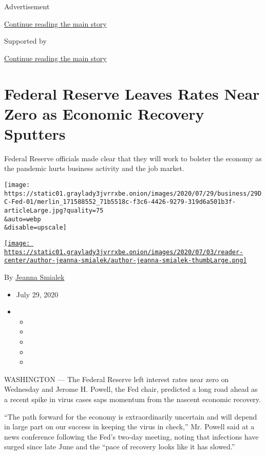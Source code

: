 Advertisement

\protect\hyperlink{after-top}{Continue reading the main story}

Supported by

\protect\hyperlink{after-sponsor}{Continue reading the main story}

\hypertarget{federal-reserve-leaves-rates-near-zero-as-economic-recovery-sputters}{%
\section{Federal Reserve Leaves Rates Near Zero as Economic Recovery
Sputters}\label{federal-reserve-leaves-rates-near-zero-as-economic-recovery-sputters}}

Federal Reserve officials made clear that they will work to bolster the
economy as the pandemic hurts business activity and the job market.

\texttt{[image: https://static01.graylady3jvrrxbe.onion/images/2020/07/29/business/29DC-Fed-01/merlin\_171588552\_71b5518c-f3c6-4426-9279-319d6a501b3f-articleLarge.jpg?quality=75\\\&auto=webp\\\&disable=upscale]}

\href{https://www.nytimes3xbfgragh.onion/by/jeanna-smialek}{\texttt{[image: https://static01.graylady3jvrrxbe.onion/images/2020/07/03/reader-center/author-jeanna-smialek/author-jeanna-smialek-thumbLarge.png]}}

By \href{https://www.nytimes3xbfgragh.onion/by/jeanna-smialek}{Jeanna
Smialek}

\begin{itemize}
\item
  July 29, 2020
\item
  \begin{itemize}
  \item
  \item
  \item
  \item
  \item
  \end{itemize}
\end{itemize}

WASHINGTON --- The Federal Reserve left interest rates near zero on
Wednesday and Jerome H. Powell, the Fed chair, predicted a long road
ahead as a recent spike in virus cases saps momentum from the nascent
economic recovery.

``The path forward for the economy is extraordinarily uncertain and will
depend in large part on our success in keeping the virus in check,'' Mr.
Powell said at a news conference following the Fed's two-day meeting,
noting that infections have surged since late June and the ``pace of
recovery looks like it has slowed.''

